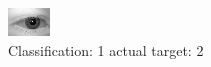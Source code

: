\begin{figure}[h!]
\begin{center}
\includegraphics[width=0.60\columnwidth]{figures/ID366_class_1_target_2.png}
\end{center}
\caption{ Classification: 1 actual target: 2}
\label{fig:ID366_class_1_target_2}
\end{figure}
